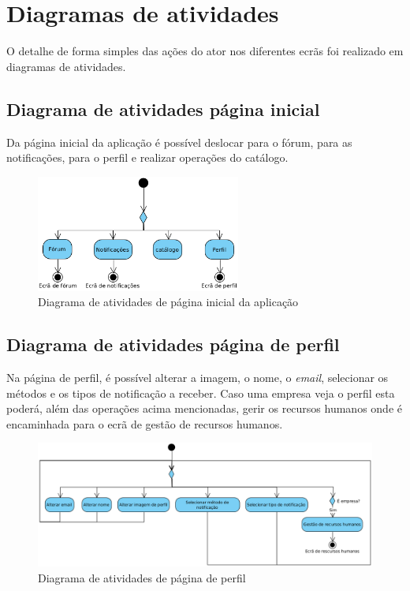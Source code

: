 \section{Diagramas de atividades}
O detalhe de forma simples das ações do ator nos diferentes ecrãs foi realizado em diagramas de atividades.

\subsection{Diagrama de atividades página inicial}

Da página inicial da aplicação é possível deslocar para o fórum, para as notificações, para o perfil e realizar operações do catálogo.

\begin{figure}[htb]
    \centering
    \includegraphics[width=0.6\textwidth]{images/diagramas/atividades/diagrama_atividades_home.png}
    \caption{Diagrama de atividades de página inicial da aplicação}
    \label{fig:34}
\end{figure}

\subsection{Diagrama de atividades página de perfil}

Na página de perfil, é possível alterar a imagem, o nome, o \textit{email}, selecionar os métodos e os tipos de notificação a receber. Caso uma empresa veja o perfil esta poderá, além das operações acima mencionadas, gerir os recursos humanos onde é encaminhada para o ecrã de gestão de recursos humanos.

\begin{figure}[htb]
    \centering
    \includegraphics[width=\textwidth]{images/diagramas/atividades/diagrama_atividades_perfil.png}
    \caption{Diagrama de atividades de página de perfil}
    \label{fig:35}
\end{figure}

